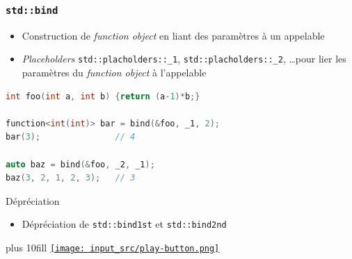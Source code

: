 \documentclass[C++.tex]{subfiles}
\begin{document}
\begin{frame}[fragile]
	\frametitle{\lstinline|std::bind|}
	\begin{itemize}
		\item Construction de \textit{function object} en liant des paramètres à un appelable
		\item \textit{Placeholders} \lstinline|std::placholders::_1|, \lstinline|std::placholders::_2|, \ldots pour lier les paramètres du \textit{function object} à l'appelable
	\end{itemize}

	\begin{lstlisting}[language=C++]
int foo(int a, int b) {return (a-1)*b;}

function<int(int)> bar = bind(&foo, _1, 2);
bar(3);               // 4

auto baz = bind(&foo, _2, _1);
baz(3, 2, 1, 2, 3);   // 3\end{lstlisting}	


	\begin{block}{Dépréciation}
		\begin{itemize}
			\item Dépréciation de \lstinline|std::bind1st| et \lstinline|std::bind2nd|
		\end{itemize}

	\end{block}

	\vskip 5mm plus 10fill
	\hfill
	\href{https://godbolt.org/#g:!((g:!((g:!((h:codeEditor,i:(filename:'1',fontScale:14,fontUsePx:'0',j:1,lang:c%2B%2B,selection:(endColumn:1,endLineNumber:17,positionColumn:1,positionLineNumber:17,selectionStartColumn:1,selectionStartLineNumber:17,startColumn:1,startLineNumber:17),source:'%23include+%3Ciostream%3E%0A%23include+%3Cfunctional%3E%0A%0Astatic+int+foo(int+a,+int+b)%0A%7B%0A++return+(a+-+1)+*+b%3B%0A%7D%0A%0Aint+main()%0A%7B%0A++std::function%3Cint(int)%3E+bar+%3D+std::bind(%26foo,+std::placeholders::_1,+2)%3B%0A++std::cout+%3C%3C+bar(3)+%3C%3C+!'%5Cn!'%3B%0A%0A++auto+baz+%3D+std::bind(%26foo,+std::placeholders::_2,+std::placeholders::_1)%3B%0A++std::cout+%3C%3C+baz(3,+2,+1,+2,+3)+%3C%3C+!'%5Cn!'%3B%0A%7D%0A'),l:'5',n:'0',o:'C%2B%2B+source+%231',t:'0')),k:50,l:'4',n:'0',o:'',s:0,t:'0'),(g:!((h:executor,i:(argsPanelShown:'1',compilationPanelShown:'0',compiler:g112,compilerOutShown:'0',execArgs:'',execStdin:'',fontScale:14,fontUsePx:'0',j:1,lang:c%2B%2B,libs:!((name:boost,ver:'175')),options:'-std%3Dc%2B%2B11',source:1,stdinPanelShown:'1',tree:'1',wrap:'0'),l:'5',n:'0',o:'Executor+x86-64+gcc+11.2+(C%2B%2B,+Editor+%231)',t:'0')),header:(),k:50,l:'4',n:'0',o:'',s:0,t:'0')),l:'2',n:'0',o:'',t:'0')),version:4}{\texttt{[image: input\_src/play-button.png]}}
\end{frame}
\end{document}
